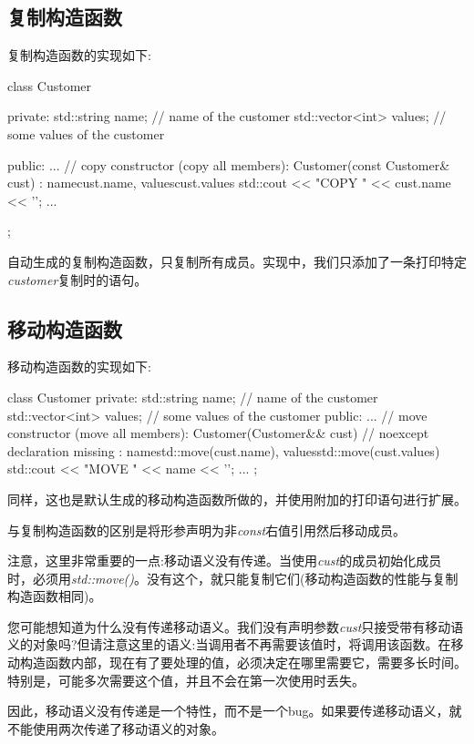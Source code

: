 \subsection{复制构造函数}

复制构造函数的实现如下:

\begin{cppcode}
class Customer {
private:
	std::string name; // name of the customer
	std::vector<int> values; // some values of the customer

public:
	...
	// copy constructor (copy all members):
	Customer(const Customer& cust)
	: name{cust.name}, values{cust.values} {
		std::cout << "COPY " << cust.name << '\n';
	}
	...
};
\end{cppcode}

自动生成的复制构造函数，只复制所有成员。实现中，我们只添加了一条打印特定\textit{customer}复制时的语句。

\subsection{移动构造函数}

移动构造函数的实现如下:

\begin{cppcode}
class Customer {
private:
	std::string name; // name of the customer
	std::vector<int> values; // some values of the customer
public:
	...
	// move constructor (move all members):
	Customer(Customer&& cust) // noexcept declaration missing
	: name{std::move(cust.name)}, values{std::move(cust.values)} {
		std::cout << "MOVE " << name << '\n';
	}
	...
};
\end{cppcode}

同样，这也是默认生成的移动构造函数所做的，并使用附加的打印语句进行扩展。

与复制构造函数的区别是将形参声明为非\textit{const}右值引用然后移动成员。

注意，这里非常重要的一点:移动语义没有传递。当使用\textit{cust}的成员初始化成员时，必须用\textit{std::move()}。没有这个，就只能复制它们(移动构造函数的性能与复制构造函数相同)。

您可能想知道为什么没有传递移动语义。我们没有声明参数\textit{cust}只接受带有移动语义的对象吗?但请注意这里的语义:当调用者不再需要该值时，将调用该函数。在移动构造函数内部，现在有了要处理的值，必须决定在哪里需要它，需要多长时间。特别是，可能多次需要这个值，并且不会在第一次使用时丢失。

因此，移动语义没有传递是一个特性，而不是一个bug。如果要传递移动语义，就不能使用两次传递了移动语义的对象。

